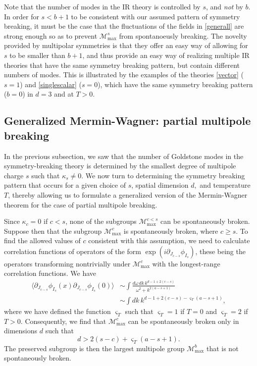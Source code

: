 \documentclass[prb,aps,twocolumn, amsfonts,amsmath,amssymb,nofootinbib,superscriptaddress]{revtex4-2}
\renewcommand{\max}{\text{max}}
\newcommand{\mmax}[1]{\mathcal{M}^{#1}_\max}
\newcommand\be            {\begin{equation}}
\newcommand\ee            {\end{equation}}
\newcommand\ba            {\begin{aligned}}
\newcommand\ea            {\end{aligned}}
\newcommand{\p}{\partial}
\begin{document}
Note that the number of modes in the IR theory is controlled by $s$, and {\it not} by $b$. In order for $s< b+1$ to be consistent with our assumed pattern of symmetry breaking, it must be the case that the fluctuations of the fields in \eqref{generall} are strong enough so as to prevent $\mmax {s}$ from spontanoeusly breaking. The novelty provided by multipolar symmetries is that they offer an easy way of allowing for $s$ to be smaller than $b+1$, and thus provide an easy way of realizing multiple IR theories that have the same symmetry breaking pattern, but contain different numbers of modes. This is illustrated by the examples of the theories \eqref{vector} ($s=1$) and \eqref{singlescalar} ($s=0$), which have the same symmetry breaking pattern ($b=0$) in $d=3$ and at $T>0$. 
	

\subsection{Generalized Mermin-Wagner: partial multipole breaking}

In the previous subsection, we saw that the number of Goldstone modes in the symmetry-breaking theory is determined by the smallest degree of multipole charge $s$ such that $\kappa_s\neq0$. We now turn to determining the symmetry breaking pattern that occurs for a given choice of $s$, spatial dimension $d,$ and temperature $T$, thereby allowing us to formulate a generalized version of the Mermin-Wagner theorem for the case of partial multipole breaking. 

Since $\kappa_c=0$ if $c<s$, none of the subgroups $\mmax {c<s}$ can be spontaneously broken. Suppose then that the subgroup $\mmax{c}$ is spontaneously broken, where $c\geq s$. To find the allowed values of $c$ consistent with this assumption, we need to calculate correlation functions of operators of the form $\exp(i\p_{J_{c-s}}\phi_{I_s})$, these being the operators transforming nontrivially under $\mmax c$ with the longest-range correlation functions. We have 
\be\ba \langle \p_{J_{c-s}}\phi_{I_s}(x) \p_{J_{c-s}}\phi_{I_s}(0)\rangle & \sim \int \frac{d\omega \, dk\, k^{d-1+2(c-s)}}{\omega^2 + k^{2(a-s+1)}} \\ 
& \sim \int dk\, k^{d-1+2(c-s) - \varsigma_T(a-s+1)}, \ea\ee 
where we have defined the function $\varsigma_T$ such that $\varsigma_T = 1$ if $T=0$ and $\varsigma_T = 2$ if $T>0$. Consequently, we find that $\mmax c$ can be spontaneously broken only in dimensions $d$ such that 
\be d>2(s-c) + \varsigma_T(a-s+1).\ee 
The preserved subgroup is then the largest multipole group $\mmax{b}$ that is not spontaneously broken.
\end{document}
